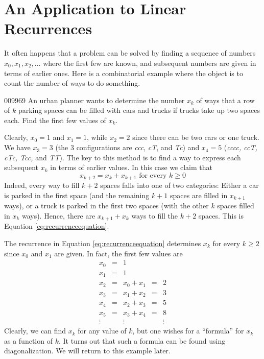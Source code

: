 \section{An Application to Linear Recurrences}
\label{sec:3_6}

It often happens that a problem can be solved by finding a sequence of numbers $x_{0}, x_{1}, x_{2}, \dots$  where the first few are known, and subsequent numbers are given in 
terms of earlier ones. Here is a combinatorial example where the object 
is to count the number of ways to do something.


\begin{example}{}{009969}
An urban planner wants to determine the number $x_{k}$ of ways that a row of $k$ parking spaces can be filled with cars and trucks if trucks take up two spaces each. Find the first few values of $x_{k}$.


\begin{solution}
  Clearly, $x_{0} = 1$ and $x_{1} = 1$, while $x_{2} = 2$ since there can be two cars or one truck. We have $x_{3} = 3$ (the $3$ configurations are \textit{ccc}, \textit{cT}, and \textit{Tc}) and $x_{4} = 5$ (\textit{cccc, ccT, cTc, Tcc,} and \textit{TT}). The key to this method is to find a way to express each subsequent $x_{k}$ in terms of earlier values. In this case we claim that
\begin{equation}\label{eq:recurrenceequation}
x_{k+2} = x_k + x_{k+1} \mbox{ for every } k \geq 0
\end{equation}
Indeed, every way to fill $k + 2$ spaces falls into one of two categories: Either a car is parked in the first space (and the remaining $k + 1$ spaces are filled in $x_{k+1}$ ways), or a truck is parked in the first two spaces (with the other $k$ spaces filled in $x_{k}$ ways). Hence, there are $x_{k+1} + x_{k}$ ways to fill the $k + 2$ spaces. This is Equation \ref{eq:recurrenceequation}.


The recurrence in Equation \ref{eq:recurrenceequation} determines $x_{k}$ for every $k \geq 2$ since $x_{0}$ and $x_{1}$ are given. In fact, the first few values are
\begin{equation*}
\begin{array}{cllll}
x_0 &=& 1 \\
x_1 &=& 1 \\
x_2 &=& x_0 + x_1 &=& 2 \\
x_3 &=& x_1 + x_2 &=& 3 \\
x_4 &=& x_2 + x_3 &=& 5 \\
x_5 &=& x_3 + x_4 &=& 8 \\
\vdots & &\vdots  & & \vdots
\end{array}
\end{equation*}
Clearly, we can find $x_{k}$ for any value of $k$, but one wishes for a ``formula'' for $x_{k}$ as a function of $k$. It turns out that such a formula can be found using diagonalization. We will return to this example later.
\end{solution}
\end{example}


